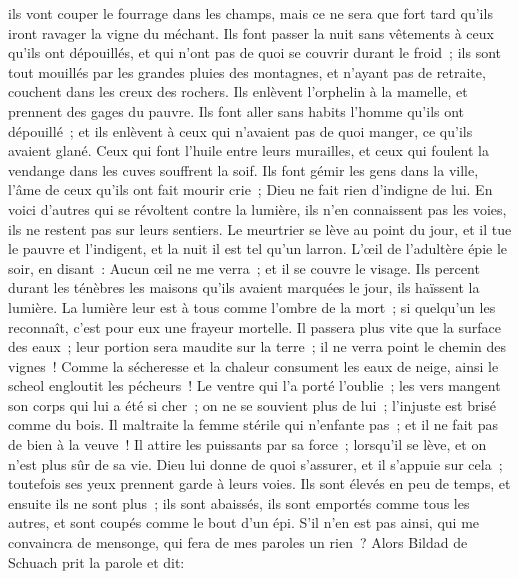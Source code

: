 \begin{multicols}{2}
ils vont couper le fourrage dans les champs, mais ce ne sera que fort tard qu'ils iront ravager la vigne du méchant.
Ils font passer la nuit sans vêtements à ceux qu'ils ont dépouillés, et qui n'ont pas de quoi se couvrir durant le froid~;
ils sont tout mouillés par les grandes pluies des montagnes, et n'ayant pas de retraite, couchent dans les creux des rochers.
Ils enlèvent l'orphelin à la mamelle, et prennent des gages du pauvre.
Ils font aller sans habits l'homme qu'ils ont dépouillé~; et ils enlèvent à ceux qui n'avaient pas de quoi manger, ce qu'ils avaient glané.
Ceux qui font l'huile entre leurs murailles, et ceux qui foulent la vendange dans les cuves souffrent la soif.
Ils font gémir les gens dans la ville, l'âme de ceux qu'ils ont fait mourir crie~; Dieu ne fait rien d'indigne de lui.
En voici d'autres qui se révoltent contre la lumière, ils n'en connaissent pas les voies, ils ne restent pas sur leurs sentiers.
Le meurtrier se lève au point du jour, et il tue le pauvre et l'indigent, et la nuit il est tel qu'un larron.
L'œil de l'adultère épie le soir, en disant~: Aucun œil ne me verra~; et il se couvre le visage.
Ils percent durant les ténèbres les maisons qu'ils avaient marquées le jour, ils haïssent la lumière.
La lumière leur est à tous comme l'ombre de la mort~; si quelqu'un les reconnaît, c'est pour eux une frayeur mortelle.
Il passera plus vite que la surface des eaux~; leur portion sera maudite sur la terre~; il ne verra point le chemin des vignes~!
Comme la sécheresse et la chaleur consument les eaux de neige, ainsi le scheol engloutit les pécheurs~!
Le ventre qui l'a porté l'oublie~; les vers mangent son corps qui lui a été si cher~; on ne se souvient plus de lui~; l'injuste est brisé comme du bois.
Il maltraite la femme stérile qui n'enfante pas~; et il ne fait pas de bien à la veuve~!
Il attire les puissants par sa force~; lorsqu'il se lève, et on n'est plus sûr de sa vie.
Dieu lui donne de quoi s'assurer, et il s'appuie sur cela~; toutefois ses yeux prennent garde à leurs voies.
Ils sont élevés en peu de temps, et ensuite ils ne sont plus~; ils sont abaissés, ils sont emportés comme tous les autres, et sont coupés comme le bout d'un épi.
S'il n'en est pas ainsi, qui me convaincra de mensonge, qui fera de mes paroles un rien~?
\VerseOne{}Alors Bildad de Schuach prit la parole et dit:

\end{multicols}
